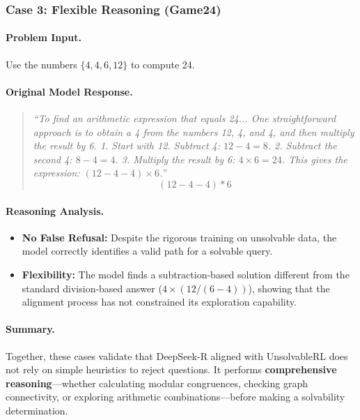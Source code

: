 \subsubsection*{Case 3: Flexible Reasoning (Game24)}

\paragraph{Problem Input.} 
Use the numbers $\{4, 4, 6, 12\}$ to compute 24.

\paragraph{Original Model Response.}
\begin{quote}
\small
\textit{``To find an arithmetic expression that equals 24... One straightforward approach is to obtain a 4 from the numbers 12, 4, and 4, and then multiply the result by 6.
1. Start with 12. Subtract 4: $12 - 4 = 8$.
2. Subtract the second 4: $8 - 4 = 4$.
3. Multiply the result by 6: $4 \times 6 = 24$.
This gives the expression: $(12 - 4 - 4) \times 6$.''}
\[ (12 - 4 - 4) * 6 \]
\end{quote}

\paragraph{Reasoning Analysis.}
\begin{itemize}
    \item \textbf{No False Refusal:} Despite the rigorous training on unsolvable data, the model correctly identifies a valid path for a solvable query.
    \item \textbf{Flexibility:} The model finds a subtraction-based solution different from the standard division-based answer ($4 \times (12 / (6 - 4))$), showing that the alignment process has not constrained its exploration capability.
\end{itemize}

\paragraph{Summary.}
Together, these cases validate that DeepSeek-R aligned with UnsolvableRL does not rely on simple heuristics to reject questions. It performs \textbf{comprehensive reasoning}—whether calculating modular congruences, checking graph connectivity, or exploring arithmetic combinations—before making a solvability determination.

